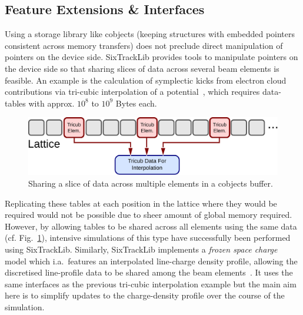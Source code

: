 \documentclass[a4paper,
               refpage,       %
               keeplastbox,   %
               ]{jacow}
\begin{document}
\subsection{Feature Extensions \& Interfaces}
Using a storage library like cobjects (keeping structures with embedded pointers consistent across memory transfers) does not preclude direct manipulation of pointers on the device side. SixTrackLib provides tools to manipulate pointers on the device side so that sharing slices of data across several beam elements is feasible. An example is the calculation of symplectic kicks from electron cloud contributions via tri-cubic interpolation of a potential~\cite{kparaschou-2020}, which requires data-tables with approx. $10^8$ to $10^9$ Bytes each. 
\begin{figure}[!hbt]
    \centering
    \includegraphics*[width=.9\columnwidth]{fig_be_external_data}
    \caption{Sharing a slice of data across multiple elements in a cobjects buffer.}
    \label{fig:be_external_data}
\end{figure}
Replicating these tables at each position in the lattice where they would be required would not be possible due to sheer amount of global memory required. However, by allowing tables to be shared across all elements using the same data (cf. Fig.~\ref{fig:be_external_data}), intensive simulations of this type have successfully been performed using SixTrackLib.
Similarly, SixTrackLib implements a \textit{frozen space charge} model which i.a.\ features an interpolated line-charge density profile, allowing the discretised line-profile data to be shared among the beam elements~\cite{aoeftiger-2021}. It uses the same interfaces as the previous tri-cubic interpolation example but the main aim here is to simplify updates to the charge-density profile over the course of the simulation.
\end{document}
